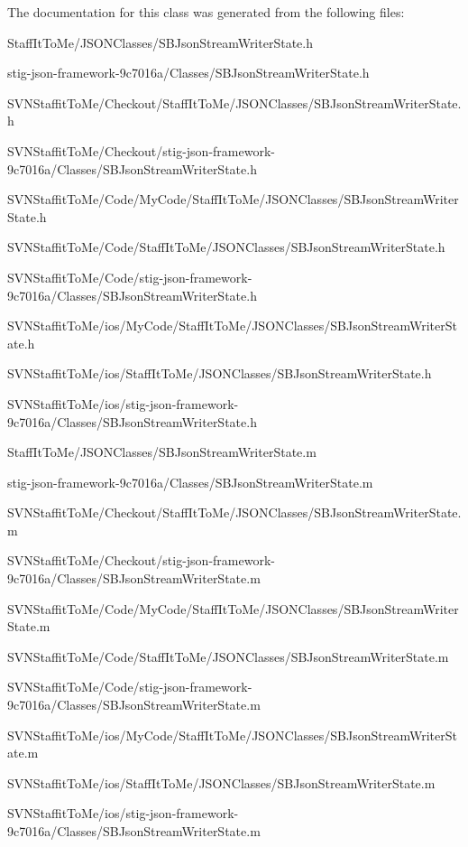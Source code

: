 \-The documentation for this class was generated from the following files\-:\begin{DoxyCompactItemize}
\item 
\-Staff\-It\-To\-Me/\-J\-S\-O\-N\-Classes/\-S\-B\-Json\-Stream\-Writer\-State.\-h\item 
stig-\/json-\/framework-\/9c7016a/\-Classes/\-S\-B\-Json\-Stream\-Writer\-State.\-h\item 
\-S\-V\-N\-Staffit\-To\-Me/\-Checkout/\-Staff\-It\-To\-Me/\-J\-S\-O\-N\-Classes/\-S\-B\-Json\-Stream\-Writer\-State.\-h\item 
\-S\-V\-N\-Staffit\-To\-Me/\-Checkout/stig-\/json-\/framework-\/9c7016a/\-Classes/\-S\-B\-Json\-Stream\-Writer\-State.\-h\item 
\-S\-V\-N\-Staffit\-To\-Me/\-Code/\-My\-Code/\-Staff\-It\-To\-Me/\-J\-S\-O\-N\-Classes/\-S\-B\-Json\-Stream\-Writer\-State.\-h\item 
\-S\-V\-N\-Staffit\-To\-Me/\-Code/\-Staff\-It\-To\-Me/\-J\-S\-O\-N\-Classes/\-S\-B\-Json\-Stream\-Writer\-State.\-h\item 
\-S\-V\-N\-Staffit\-To\-Me/\-Code/stig-\/json-\/framework-\/9c7016a/\-Classes/\-S\-B\-Json\-Stream\-Writer\-State.\-h\item 
\-S\-V\-N\-Staffit\-To\-Me/ios/\-My\-Code/\-Staff\-It\-To\-Me/\-J\-S\-O\-N\-Classes/\-S\-B\-Json\-Stream\-Writer\-State.\-h\item 
\-S\-V\-N\-Staffit\-To\-Me/ios/\-Staff\-It\-To\-Me/\-J\-S\-O\-N\-Classes/\-S\-B\-Json\-Stream\-Writer\-State.\-h\item 
\-S\-V\-N\-Staffit\-To\-Me/ios/stig-\/json-\/framework-\/9c7016a/\-Classes/\-S\-B\-Json\-Stream\-Writer\-State.\-h\item 
\-Staff\-It\-To\-Me/\-J\-S\-O\-N\-Classes/\-S\-B\-Json\-Stream\-Writer\-State.\-m\item 
stig-\/json-\/framework-\/9c7016a/\-Classes/\-S\-B\-Json\-Stream\-Writer\-State.\-m\item 
\-S\-V\-N\-Staffit\-To\-Me/\-Checkout/\-Staff\-It\-To\-Me/\-J\-S\-O\-N\-Classes/\-S\-B\-Json\-Stream\-Writer\-State.\-m\item 
\-S\-V\-N\-Staffit\-To\-Me/\-Checkout/stig-\/json-\/framework-\/9c7016a/\-Classes/\-S\-B\-Json\-Stream\-Writer\-State.\-m\item 
\-S\-V\-N\-Staffit\-To\-Me/\-Code/\-My\-Code/\-Staff\-It\-To\-Me/\-J\-S\-O\-N\-Classes/\-S\-B\-Json\-Stream\-Writer\-State.\-m\item 
\-S\-V\-N\-Staffit\-To\-Me/\-Code/\-Staff\-It\-To\-Me/\-J\-S\-O\-N\-Classes/\-S\-B\-Json\-Stream\-Writer\-State.\-m\item 
\-S\-V\-N\-Staffit\-To\-Me/\-Code/stig-\/json-\/framework-\/9c7016a/\-Classes/\-S\-B\-Json\-Stream\-Writer\-State.\-m\item 
\-S\-V\-N\-Staffit\-To\-Me/ios/\-My\-Code/\-Staff\-It\-To\-Me/\-J\-S\-O\-N\-Classes/\-S\-B\-Json\-Stream\-Writer\-State.\-m\item 
\-S\-V\-N\-Staffit\-To\-Me/ios/\-Staff\-It\-To\-Me/\-J\-S\-O\-N\-Classes/\-S\-B\-Json\-Stream\-Writer\-State.\-m\item 
\-S\-V\-N\-Staffit\-To\-Me/ios/stig-\/json-\/framework-\/9c7016a/\-Classes/\-S\-B\-Json\-Stream\-Writer\-State.\-m\end{DoxyCompactItemize}
